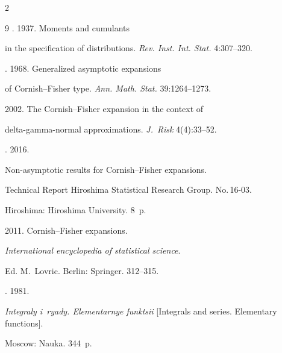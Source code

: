 \begin{multicols}{2}
{{\begin{thebibliography}{9}
. 1937. Moments and cumulants 

in the specification of distributions. \textit{Rev. Inst. Int. Stat.} 4:307--320.




. 1968. Generalized asymptotic expansions 

of Cornish--Fisher type. \textit{Ann. Math. Stat.} 39:1264--1273.




 2002. The Cornish--Fisher expansion in the context of 

delta-gamma-normal approximations. \textit{J.~Risk} 4(4):33--52.




. 2016. 

Non-asymptotic results for Cornish--Fisher expansions. 

Technical Report Hiroshima Statistical Research Group. No.\,16-03. 

Hiroshima: Hiroshima University. 8~p. 




 2011. Cornish--Fisher expansions.

\textit{International encyclopedia of statistical science}.

Ed. M.~Lovric. Berlin: Springer. 312--315.




. 1981. 

\textit{Integraly i~ryady. Elementarnye funktsii} [Integrals and series. Elementary functions]. 

Moscow: Nauka. 344~p.



\end{thebibliography}



 }

 }



\end{multicols}



